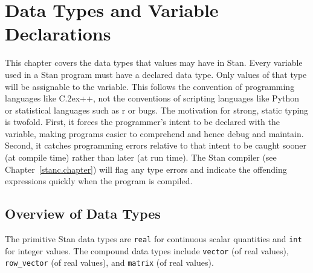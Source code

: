 \documentclass[10pt]{report}
\newcommand{\Stan}{Stan\xspace}
\newcommand*{\Cpp}{C\raise.2ex\hbox{\footnotesize ++}\xspace} %
\newcommand{\acronym}[1]{{\sc #1}\xspace}
\newcommand{\R}{\acronym{r}}
\newcommand{\BUGS}{\acronym{bugs}}
\newcommand{\code}[1]{{\tt #1}}
\newcommand{\refchapter}[1]{Chapter~\ref{#1.chapter}}
\begin{document}



\chapter{Data Types and Variable Declarations}\label{data-types.chapter}

This chapter covers the data types that values may have in \Stan.
Every variable used in a \Stan program must have a declared data type.
Only values of that type will be assignable to the variable.  This
follows the convention of programming languages like \Cpp, not the
conventions of scripting languages like Python or statistical
languages such as \R or \BUGS.  The motivation for strong, static
typing is twofold.  First, it forces the programmer's intent to be
declared with the variable, making programs easier to comprehend and
hence debug and maintain.  Second, it catches programming errors
relative to that intent to be caught sooner (at compile time) rather
than later (at run time).  The \Stan compiler (see \refchapter{stanc})
will flag any type errors and indicate the offending expressions
quickly when the program is compiled.

\section{Overview of Data Types}

The primitive \Stan data types are \code{real} for continuous scalar
quantities and \code{int} for integer values.  The compound data
types include \code{vector} (of real values), \code{row\_vector} (of
real values), and \code{matrix} (of real values).
\end{document}
